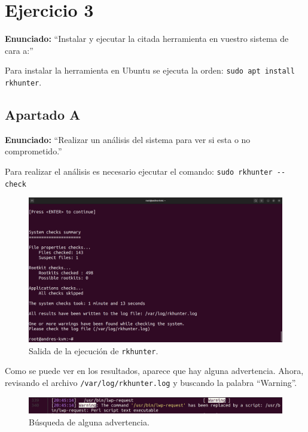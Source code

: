 \documentclass{article}
\begin{document}
\newpage

\section{Ejercicio 3}
\textbf{Enunciado: }``Instalar y ejecutar la citada herramienta en vuestro sistema de cara a:''

\bigskip

Para instalar la herramienta en Ubuntu se ejecuta la orden: \verb|sudo apt install rkhunter|.

\subsection{Apartado A}

\textbf{Enunciado: }``Realizar un análisis del sistema para ver si esta o no comprometido.''

\bigskip

Para realizar el análisis es necesario ejecutar el comando: \verb|sudo rkhunter --check|

\begin{figure}[H]
    \includegraphics[width=\textwidth]{imagenes/rkhuntersalida1.png}
    \caption{Salida de la ejecución de \texttt{rkhunter}.}
\end{figure}

Como se puede ver en los resultados, aparece que hay alguna advertencia. Ahora, revisando el archivo \verb|/var/log/rkhunter.log| y buscando la palabra ``Warning''.

\begin{figure}[H]
    \includegraphics[width=\textwidth]{imagenes/warn1.png}
    \caption{Búsqueda de alguna advertencia.}
\end{figure}
\end{document}
